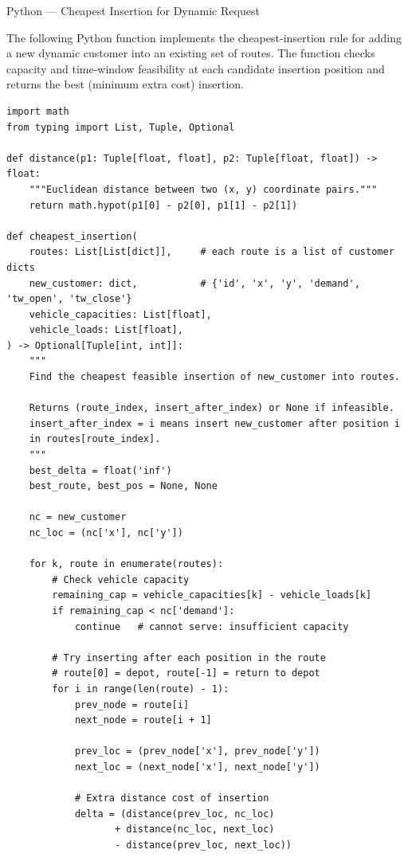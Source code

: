 \documentclass[aspectratio=169,10pt]{beamer}
\begin{document}
\begin{frame}[fragile]{Python — Cheapest Insertion for Dynamic Request}

The following Python function implements the cheapest-insertion rule for
adding a new dynamic customer into an existing set of routes.  The function
checks capacity and time-window feasibility at each candidate insertion
position and returns the best (minimum extra cost) insertion.

\begin{lstlisting}
import math
from typing import List, Tuple, Optional

def distance(p1: Tuple[float, float], p2: Tuple[float, float]) -> float:
    """Euclidean distance between two (x, y) coordinate pairs."""
    return math.hypot(p1[0] - p2[0], p1[1] - p2[1])

def cheapest_insertion(
    routes: List[List[dict]],     # each route is a list of customer dicts
    new_customer: dict,           # {'id', 'x', 'y', 'demand', 'tw_open', 'tw_close'}
    vehicle_capacities: List[float],
    vehicle_loads: List[float],
) -> Optional[Tuple[int, int]]:
    """
    Find the cheapest feasible insertion of new_customer into routes.

    Returns (route_index, insert_after_index) or None if infeasible.
    insert_after_index = i means insert new_customer after position i
    in routes[route_index].
    """
    best_delta = float('inf')
    best_route, best_pos = None, None

    nc = new_customer
    nc_loc = (nc['x'], nc['y'])

    for k, route in enumerate(routes):
        # Check vehicle capacity
        remaining_cap = vehicle_capacities[k] - vehicle_loads[k]
        if remaining_cap < nc['demand']:
            continue   # cannot serve: insufficient capacity

        # Try inserting after each position in the route
        # route[0] = depot, route[-1] = return to depot
        for i in range(len(route) - 1):
            prev_node = route[i]
            next_node = route[i + 1]

            prev_loc = (prev_node['x'], prev_node['y'])
            next_loc = (next_node['x'], next_node['y'])

            # Extra distance cost of insertion
            delta = (distance(prev_loc, nc_loc)
                   + distance(nc_loc, next_loc)
                   - distance(prev_loc, next_loc))


\end{lstlisting}
\end{frame}
\end{document}
